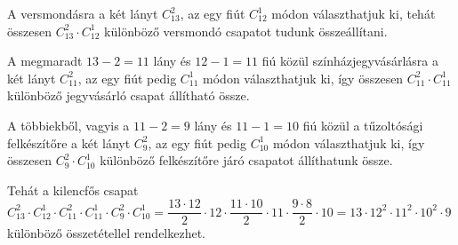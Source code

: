 \begin{solution}
A versmondásra a két lányt $C_{13}^{2}$, az egy fiút $C_{12}^{1}$
módon választhatjuk ki, tehát összesen $C_{13}^{2}\cdot C_{12}^{1}$
különböző versmondó csapatot tudunk összeállítani.

A megmaradt $13-2=11$ lány és $12-1=11$ fiú közül színházjegyvásárlásra
a két lányt $C_{11}^{2}$, az egy fiút pedig $C_{11}^{1}$ módon választhatjuk
ki, így összesen $C_{11}^{2}\cdot C_{11}^{1}$ különböző jegyvásárló
csapat állítható össze.

A többiekből, vagyis a $11-2=9$ lány és $11-1=10$ fiú közül a tűzoltósági
felkészítőre a két lányt $C_{9}^{2}$, az egy fiút pedig $C_{10}^{1}$
módon választhatjuk ki, így összesen $C_{9}^{2}\cdot C_{10}^{1}$
különböző felkészítőre járó csapatot állíthatunk össze.

Tehát a kilencfős csapat $C_{13}^{2}\cdot C_{12}^{1}\cdot C_{11}^{2}\cdot C_{11}^{1}\cdot C_{9}^{2}\cdot C_{10}^{1}=\dfrac{13\cdot12}{2}\cdot12\cdot\dfrac{11\cdot10}{2}\cdot11\cdot\dfrac{9\cdot8}{2}\cdot10=13\cdot12^{2}\cdot11^{2}\cdot10^{2}\cdot9$
különböző összetétellel rendelkezhet. 
\end{solution}
